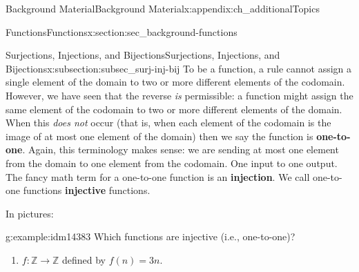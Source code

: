 \documentclass[oneside,10pt,]{book}
\newcommand{\terminology}[1]{\textbf{#1}}
\numberwithin{equation}{chapter}
\def\Z{\mathbb Z}
\begin{document}
\begin{appendixptx}{Background Material}{}{Background Material}{}{}{x:appendix:ch_additionalTopics}
\begin{sectionptx}{Functions}{}{Functions}{}{}{x:section:sec_background-functions}
\begin{subsectionptx}{Surjections, Injections, and Bijections}{}{Surjections, Injections, and Bijections}{}{}{x:subsection:subsec_surj-inj-bij}
To be a function, a rule cannot assign a single element of the domain to two or more different elements of the codomain. However, we have seen that the reverse \emph{is} permissible: a function might assign the same element of the codomain to two or more different elements of the domain. When this \emph{does not} occur (that is, when each element of the codomain is the image of at most one element of the domain) then we say the function is \terminology{one-to-one}. Again, this terminology makes sense: we are sending at most one element from the domain to one element from the codomain. One input to one output. The fancy math term for a one-to-one function is an \terminology{injection}. We call one-to-one functions \terminology{injective} functions.%
\par
In pictures:%
\begin{sidebyside}{2}{0.05}{0.05}{0.1}%
\begin{sbspanel}{0.4}%
%
\end{sbspanel}%
\begin{sbspanel}{0.4}%
%
\end{sbspanel}%
\end{sidebyside}%
\begin{example}{}{g:example:idm14383}%
Which functions are injective (i.e., one-to-one)?%
\par
%
\begin{enumerate}
\item{}\(f:\Z \to \Z\) defined by \(f(n) = 3n\).%

\end{enumerate}
\end{example}
\end{subsectionptx}
\end{sectionptx}
\end{appendixptx}
\end{document}
